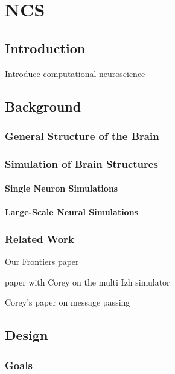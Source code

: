 \chapter{NCS}
\label{chapter:ncs}

\section{Introduction}

Introduce computational neuroscience

\section{Background}

\subsection{General Structure of the Brain}

\subsection{Simulation of Brain Structures}

\subsubsection{Single Neuron Simulations}

\subsubsection{Large-Scale Neural Simulations}

\subsection{Related Work}

Our Frontiers paper~\cite{frontiers_ncs}

\cite{multi_gpu_izh} paper with Corey on the multi Izh simulator

\cite{neuron_messages} Corey's paper on message passing 


\section{Design}

\subsection{Goals}

